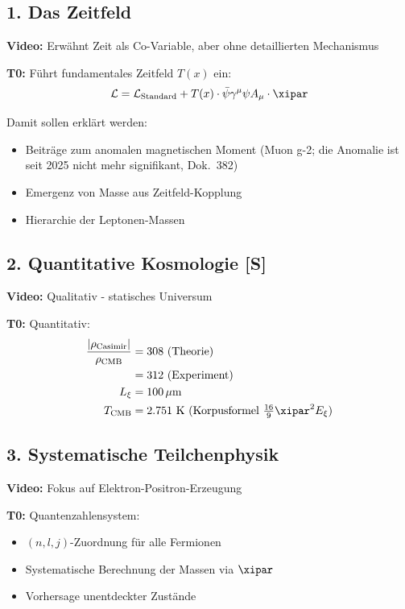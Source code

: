 	\subsection{1. Das Zeitfeld}
	
	\textbf{Video:} Erwähnt Zeit als Co-Variable, aber ohne detaillierten Mechanismus
	
	\textbf{T0:} Führt fundamentales Zeitfeld $T(x)$ ein:
	\begin{equation}
		\mathcal{L} = \mathcal{L}_{\text{Standard}} + T(x) \cdot \bar{\psi}\gamma^\mu\psi A_\mu \cdot \xipar
	\end{equation}
	
	Damit sollen erklärt werden:
	\begin{itemize}
		\item Beiträge zum anomalen magnetischen Moment (Muon g-2; die Anomalie ist seit 2025 nicht mehr signifikant, Dok.~382)
		\item Emergenz von Masse aus Zeitfeld-Kopplung
		\item Hierarchie der Leptonen-Massen
	\end{itemize}
	
	\subsection{2. Quantitative Kosmologie [S]}
	
	\textbf{Video:} Qualitativ - statisches Universum
	
	\textbf{T0:} Quantitativ:
	\begin{align}
		\frac{|\rho_{\text{Casimir}}|}{\rho_{\text{CMB}}} &= 308 \text{ (Theorie)} \\
		&= 312 \text{ (Experiment)} \\
		L_\xi &= 100 \, \mu\text{m} \\
		T_{\text{CMB}} &= 2.751 \text{ K (Korpusformel } \tfrac{16}{9}\xipar^2 E_\xi\text{)}
	\end{align}
	
	\subsection{3. Systematische Teilchenphysik}
	
	\textbf{Video:} Fokus auf Elektron-Positron-Erzeugung
	
	\textbf{T0:} Quantenzahlensystem:
	\begin{itemize}
		\item $(n,l,j)$-Zuordnung für alle Fermionen
		\item Systematische Berechnung der Massen via $\xipar$
		\item Vorhersage unentdeckter Zustände
	\end{itemize}
	
